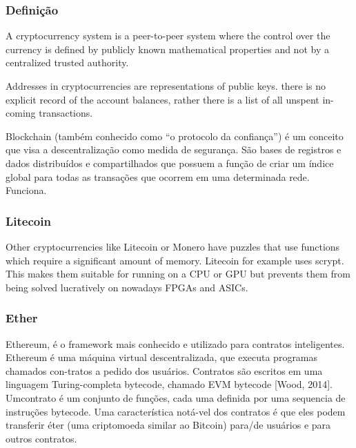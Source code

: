 \documentclass[
	article,			%
	12pt,				%
	openright,			%
	oneside,			%
	a4paper,			%
	chapter=TITLE,		%
	section=TITLE,		%
	subsection=TITLE,	%
	subsubsection=TITLE,%
	subsubsubsection=TITLE, %
	english,			%
	brazil,				%
	]{abntex2}
\begin{document}
\subsubsection{Definição}

A cryptocurrency system is a peer-to-peer system where the control over the currency is defined by publicly known mathematical properties and not by a centralized trusted authority.

\cite{Weber2012}

Addresses in cryptocurrencies are representations of public keys. there is no explicit record of the account balances, rather there is a list of all unspent in-coming transactions.
\cite{Weber2012}

Blockchain (também conhecido como “o protocolo da confiança”) é um conceito que visa a descentralização como medida de segurança. São bases de registros e dados distribuídos e compartilhados que possuem a função de criar um índice global para todas as transações que ocorrem em uma determinada rede. Funciona.

\cite{LChicarino}

\subsubsection{Litecoin}

Other cryptocurrencies like Litecoin or Monero have puzzles that use functions which require a significant amount of memory. Litecoin for example uses scrypt. This makes them suitable for running on a CPU or GPU but prevents them
from being solved lucratively on nowadays FPGAs and ASICs.

\cite{Weber2012}

\subsubsection{Ether}

Ethereum, é o framework mais conhecido e utilizado para contratos inteligentes. Ethereum é uma máquina virtual descentralizada, que executa programas chamados con-tratos a pedido dos usuários. Contratos são escritos em uma linguagem Turing-completa bytecode, chamado EVM bytecode [Wood, 2014]. Umcontrato é um conjunto de funções, cada uma definida por uma sequencia de instruções bytecode. Uma característica notá-vel dos contratos é que eles podem transferir éter (uma criptomoeda similar ao Bitcoin) para/de usuários e para outros contratos.

\cite{Dlamini2017}
\end{document}
